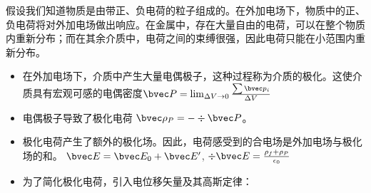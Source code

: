 
假设我们知道物质是由带正、负电荷的粒子组成的。在外加电场下，物质中的正、负电荷将对外加电场做出响应。在金属中，存在大量自由的电荷，可以在整个物质内重新分布；而在其余介质中，电荷之间的束缚很强，因此电荷只能在小范围内重新分布。

\begin{itemize}
\item 在外加电场下，介质中产生大量电偶极子，这种过程称为介质的极化。这使介质具有宏观可感的电偶密度$\bvec P = \lim_{\Delta V \to 0} \frac{\sum \bvec p_i}{\Delta V}$ 
\item 电偶极子导致了极化电荷 $\bvec \rho_P = - \div \bvec P$。
\item 极化电荷产生了额外的极化场。因此，电荷感受到的合电场是外加电场与极化场的和。 $\bvec E = \bvec E_0 + \bvec E'$, $\div \bvec E = \frac{\rho_f+\rho_P}{\epsilon_0}$
\item 为了简化极化电荷，引入电位移矢量及其高斯定律：
\end{itemize}
